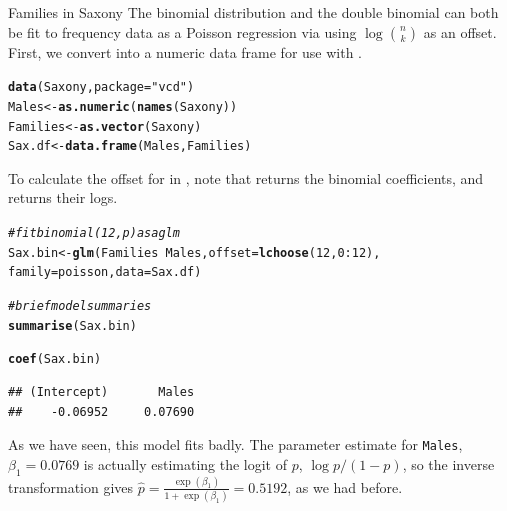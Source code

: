 \documentclass[11pt]{book}\usepackage[]{graphicx}\usepackage[]{color}
\makeatletter
\newcommand{\hlnum}[1]{\textcolor[rgb]{0.686,0.059,0.569}{#1}}%
\newcommand{\hlstr}[1]{\textcolor[rgb]{0.192,0.494,0.8}{#1}}%
\newcommand{\hlcom}[1]{\textcolor[rgb]{0.678,0.584,0.686}{\textit{#1}}}%
\newcommand{\hlopt}[1]{\textcolor[rgb]{0,0,0}{#1}}%
\newcommand{\hlstd}[1]{\textcolor[rgb]{0.345,0.345,0.345}{#1}}%
\newcommand{\hlkwb}[1]{\textcolor[rgb]{0.69,0.353,0.396}{#1}}%
\newcommand{\hlkwc}[1]{\textcolor[rgb]{0.333,0.667,0.333}{#1}}%
\newcommand{\hlkwd}[1]{\textcolor[rgb]{0.737,0.353,0.396}{\textbf{#1}}}%
\newenvironment{kframe}{%
 \def\at@end@of@kframe{}%
 \ifinner\ifhmode%
  \def\at@end@of@kframe{\end{minipage}}%
  \begin{minipage}{\columnwidth}%
 \fi\fi%
 \def\FrameCommand##1{\hskip\@totalleftmargin \hskip-\fboxsep
 \colorbox{shadecolor}{##1}\hskip-\fboxsep
     \hskip-\linewidth \hskip-\@totalleftmargin \hskip\columnwidth}%
 \MakeFramed {\advance\hsize-\width
   \@totalleftmargin\z@ \linewidth\hsize
   \@setminipage}}%
 {\par\unskip\endMakeFramed%
 \at@end@of@kframe}
\newenvironment{knitrout}{}{} %
\renewenvironment{knitrout}{\small\renewcommand{\baselinestretch}{.85}}{} %
\makeatother
\begin{document}
\begin{Example}[saxony2]{Families in Saxony}
The binomial distribution and the double binomial can both be fit to frequency data as a Poisson regression via 
using $\log \binom{n}{k}$ as an offset. 
First, we convert  into a numeric data frame for use with .
\begin{knitrout}
\color{fgcolor}\begin{kframe}
\begin{alltt}
\hlkwd{data}\hlstd{(Saxony,} \hlkwc{package}\hlstd{=}\hlstr{"vcd"}\hlstd{)}
\hlstd{Males} \hlkwb{<-} \hlkwd{as.numeric}\hlstd{(}\hlkwd{names}\hlstd{(Saxony))}
\hlstd{Families} \hlkwb{<-} \hlkwd{as.vector}\hlstd{(Saxony)}
\hlstd{Sax.df} \hlkwb{<-} \hlkwd{data.frame}\hlstd{(Males, Families)}
\end{alltt}
\end{kframe}
\end{knitrout}

To calculate the offset  for  in \R, 
note that  returns the
binomial coefficients, and  returns their logs.
\begin{knitrout}
\color{fgcolor}\begin{kframe}
\begin{alltt}
\hlcom{# fit binomial (12, p) as a glm}
\hlstd{Sax.bin} \hlkwb{<-} \hlkwd{glm}\hlstd{(Families} \hlopt{~} \hlstd{Males,} \hlkwc{offset}\hlstd{=}\hlkwd{lchoose}\hlstd{(}\hlnum{12}\hlstd{,}\hlnum{0}\hlopt{:}\hlnum{12}\hlstd{),}
               \hlkwc{family}\hlstd{=poisson,} \hlkwc{data}\hlstd{=Sax.df)}

\hlcom{# brief model summaries}
\hlkwd{summarise}\hlstd{(Sax.bin)}
\end{alltt}


{\ttfamily\noindent\bfseries\color{errorcolor}{\#\# Error: length(rows) == 1 is not TRUE}}\begin{alltt}
\hlkwd{coef}\hlstd{(Sax.bin)}
\end{alltt}
\begin{verbatim}
## (Intercept)       Males 
##    -0.06952     0.07690
\end{verbatim}
\end{kframe}
\end{knitrout}

As we have seen, this model fits badly.  
The parameter estimate for \texttt{Males}, $\beta_1 = 0.0769$
is actually estimating the logit of $p$, $\log p / (1-p)$,
so the inverse transformation gives
$\hat{p} = \frac{\exp (\beta_1)}{1 + \exp (\beta_1)} = 0.5192$,
as we had before.



\end{Example}
\end{document}

